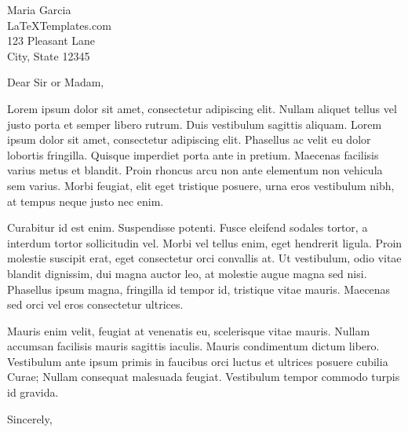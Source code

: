 \documentclass[
	pagenumber=false, %
	parskip=half, %
	fromalign=right, %
	foldmarks=true, %
	addrfield=true %
	]{scrlttr2}
\date{\today} %
\begin{document}
 
\begin{letter}{Maria Garcia \\ LaTeXTemplates.com \\ 123 Pleasant Lane \\ City, State 12345} %


\opening{Dear Sir or Madam,}

Lorem ipsum dolor sit amet, consectetur adipiscing elit. Nullam aliquet tellus vel justo porta et semper libero rutrum. Duis vestibulum sagittis aliquam. Lorem ipsum dolor sit amet, consectetur adipiscing elit. Phasellus ac velit eu dolor lobortis fringilla. Quisque imperdiet porta ante in pretium. Maecenas facilisis varius metus et blandit. Proin rhoncus arcu non ante elementum non vehicula sem varius. Morbi feugiat, elit eget tristique posuere, urna eros vestibulum nibh, at tempus neque justo nec enim.

Curabitur id est enim. Suspendisse potenti. Fusce eleifend sodales tortor, a interdum tortor sollicitudin vel. Morbi vel tellus enim, eget hendrerit ligula. Proin molestie suscipit erat, eget consectetur orci convallis at. Ut vestibulum, odio vitae blandit dignissim, dui magna auctor leo, at molestie augue magna sed nisi. Phasellus ipsum magna, fringilla id tempor id, tristique vitae mauris. Maecenas sed orci vel eros consectetur ultrices.

Mauris enim velit, feugiat at venenatis eu, scelerisque vitae mauris. Nullam accumsan facilisis mauris sagittis iaculis. Mauris condimentum dictum libero. Vestibulum ante ipsum primis in faucibus orci luctus et ultrices posuere cubilia Curae; Nullam consequat malesuada feugiat. Vestibulum tempor commodo turpis id gravida.

\closing{Sincerely,}



\end{letter}
 
\end{document}

